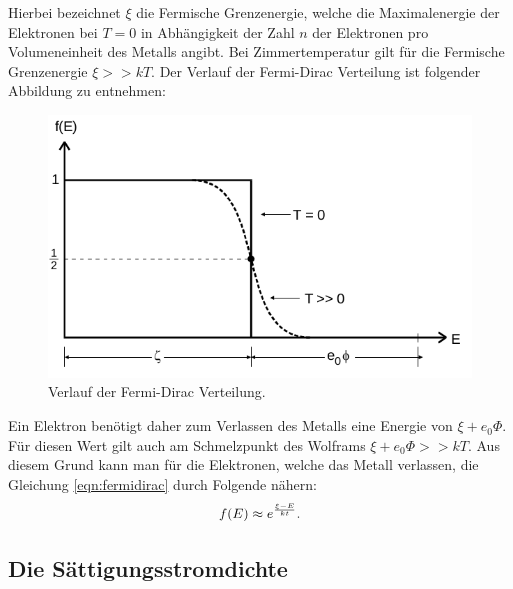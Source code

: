 \noindent
Hierbei bezeichnet $\xi$ die Fermische Grenzenergie, welche die Maximalenergie
der Elektronen bei $T = 0$ in Abhängigkeit der Zahl $n$ der Elektronen pro
Volumeneinheit des Metalls angibt. Bei Zimmertemperatur gilt für die Fermische
Grenzenergie $\xi >> kT$. Der Verlauf der Fermi-Dirac Verteilung ist folgender
Abbildung zu entnehmen:
\begin{figure}[H]
  \centering
  \includegraphics[scale=0.5]{content/fermidirac.png}
  \caption{Verlauf der Fermi-Dirac Verteilung.}
  \label{fig:fermidirac}
\end{figure}
\noindent
Ein Elektron benötigt daher zum Verlassen des Metalls eine Energie von
$\xi + e_0 \Phi$. Für diesen Wert gilt auch am Schmelzpunkt des Wolframs
$\xi + e_0 \Phi >> kT$. Aus diesem Grund kann man für die Elektronen, welche
das Metall verlassen, die Gleichung \eqref{eqn:fermidirac} durch Folgende nähern:
\begin{equation}
  \centering
  f(E) \approx e^{\frac{\xi -E}{kt}}.
  \label{eqn:approxfermidirac}
\end{equation}
\noindent

\subsection{Die Sättigungsstromdichte}
